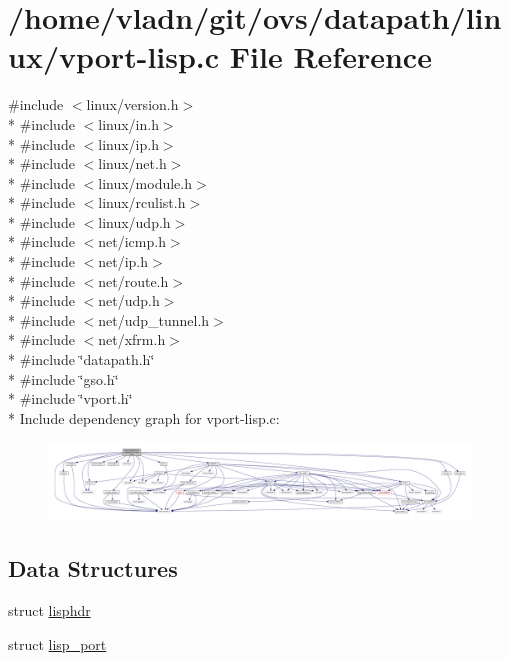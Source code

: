 \hypertarget{linux_2vport-lisp_8c}{}\section{/home/vladn/git/ovs/datapath/linux/vport-\/lisp.c File Reference}
\label{linux_2vport-lisp_8c}
{\ttfamily \#include $<$linux/version.\+h$>$}\\*
{\ttfamily \#include $<$linux/in.\+h$>$}\\*
{\ttfamily \#include $<$linux/ip.\+h$>$}\\*
{\ttfamily \#include $<$linux/net.\+h$>$}\\*
{\ttfamily \#include $<$linux/module.\+h$>$}\\*
{\ttfamily \#include $<$linux/rculist.\+h$>$}\\*
{\ttfamily \#include $<$linux/udp.\+h$>$}\\*
{\ttfamily \#include $<$net/icmp.\+h$>$}\\*
{\ttfamily \#include $<$net/ip.\+h$>$}\\*
{\ttfamily \#include $<$net/route.\+h$>$}\\*
{\ttfamily \#include $<$net/udp.\+h$>$}\\*
{\ttfamily \#include $<$net/udp\+\_\+tunnel.\+h$>$}\\*
{\ttfamily \#include $<$net/xfrm.\+h$>$}\\*
{\ttfamily \#include \char`\"{}datapath.\+h\char`\"{}}\\*
{\ttfamily \#include \char`\"{}gso.\+h\char`\"{}}\\*
{\ttfamily \#include \char`\"{}vport.\+h\char`\"{}}\\*
Include dependency graph for vport-\/lisp.c\+:
\nopagebreak
\begin{figure}[H]
\begin{center}
\leavevmode
\includegraphics[width=350pt]{linux_2vport-lisp_8c__incl}
\end{center}
\end{figure}
\subsection*{Data Structures}
\begin{DoxyCompactItemize}
\item 
struct \hyperlink{structlisphdr}{lisphdr}
\item 
struct \hyperlink{structlisp__port}{lisp\+\_\+port}
\end{DoxyCompactItemize}
